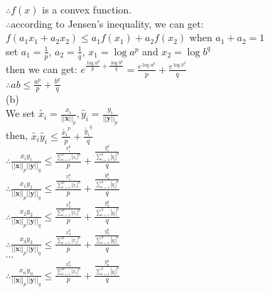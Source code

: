 \documentclass{article}
\begin{document}
$\therefore$\qquad$f(x)$ is a convex function.\\

$\therefore$\qquad according to Jensen's inequality, we can get: $f(a_1x_1+a_2x_2)\leq a_1f(x_1)+a_2f(x_2)$ when $a_1+a_2=1$\\

set $a_1=\displaystyle\frac{1}{p}$, $a_2=\displaystyle\frac{1}{q}$, $x_1=\log a^p$ and $x_2=\log b^q$\\

then we can get: $e^{\frac{\log a^p}{p}+\frac{\log b^q}{q}}=\displaystyle\frac{e^{\log a^p}}{p}+\frac{e^{\log b^q}}{q}$\\

$\therefore$\qquad$ab\leq\displaystyle\frac{a^p}{p}+\frac{b^q}{q}$\\

(b)\\

We set $\widetilde{x_i}=\displaystyle\frac{x_i}{||\textbf{x}||_p}, \widetilde{y_i}=\displaystyle\frac{y_i}{||\textbf{y}||_p}$\\

then, $\widetilde{x_i}\widetilde{y_i}\leq\displaystyle\frac{\widetilde{x_i}^p}{p}+\frac{\widetilde{y_i}^q}{q}$\\

$\therefore$\qquad$\displaystyle\frac{x_iy_i}{||\textbf{x}||_p||\textbf{y}||_q}\leq\frac{\frac{x_i^p}{\sum \limits_{i=1}^n|x_i|^p}}{p}+\frac{\frac{y_i^q}{\sum \limits_{i=1}^n|y_i|^q}}{q}$\\

$\therefore$\qquad$\displaystyle\frac{x_1y_1}{||\textbf{x}||_p||\textbf{y}||_q}\leq\frac{\frac{x_1^p}{\sum \limits_{i=1}^n|x_i|^p}}{p}+\frac{\frac{y_1^q}{\sum \limits_{i=1}^n|y_i|^q}}{q}$\\

$\therefore$\qquad$\displaystyle\frac{x_2y_2}{||\textbf{x}||_p||\textbf{y}||_q}\leq\frac{\frac{x_2^p}{\sum \limits_{i=1}^n|x_i|^p}}{p}+\frac{\frac{y_2^q}{\sum \limits_{i=1}^n|y_i|^q}}{q}$\\

$\therefore$\qquad$\displaystyle\frac{x_3y_3}{||\textbf{x}||_p||\textbf{y}||_q}\leq\frac{\frac{x_3^p}{\sum \limits_{i=1}^n|x_i|^p}}{p}+\frac{\frac{y_3^q}{\sum \limits_{i=1}^n|y_i|^q}}{q}$\\

$\cdots$\\

$\therefore$\qquad$\displaystyle\frac{x_ny_n}{||\textbf{x}||_p||\textbf{y}||_q}\leq\frac{\frac{x_n^p}{\sum \limits_{i=1}^n|x_i|^p}}{p}+\frac{\frac{y_n^q}{\sum \limits_{i=1}^n|y_i|^q}}{q}$\\
\end{document}
